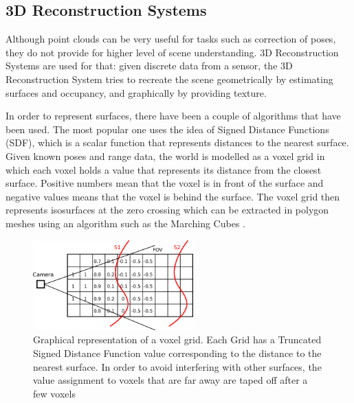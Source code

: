 \documentclass[11pt]{article}
\begin{document}
	\subsection{3D Reconstruction Systems}

Although point clouds can be very useful for tasks such as correction of poses, they do not provide for higher level of scene understanding. 3D Reconstruction Systems are used for that: given discrete data from a sensor, the 3D Reconstruction System tries to recreate the scene geometrically by estimating surfaces and occupancy, and graphically by providing texture.
		
In order to represent surfaces, there have been a couple of algorithms that have been used. The most popular one uses the idea of Signed Distance Functions (SDF), which is a scalar function that represents distances to the nearest surface. Given known poses and range data, the world is modelled as a voxel grid in which each voxel holds  a value that represents its distance from the closest surface. Positive numbers mean that the voxel is in front of the surface and negative values means that the voxel is behind the surface. The voxel grid then represents isosurfaces at the zero crossing which can be extracted in polygon meshes using an algorithm such as the Marching Cubes \cite{marchingcubes}.
	
\begin{figure}
	\centering
	\vspace{-58pt}
	\includegraphics[width=0.55\textwidth]{TSDF}
	\caption[t]{Graphical representation of a voxel grid. Each Grid has a Truncated Signed Distance Function value corresponding to the distance to the nearest surface. In order to avoid interfering with other surfaces, the value assignment to voxels that are far away are taped off after a few voxels}
	\label{fig:TSDF}
	\vspace{-20pt}
\end{figure}
\end{document}
